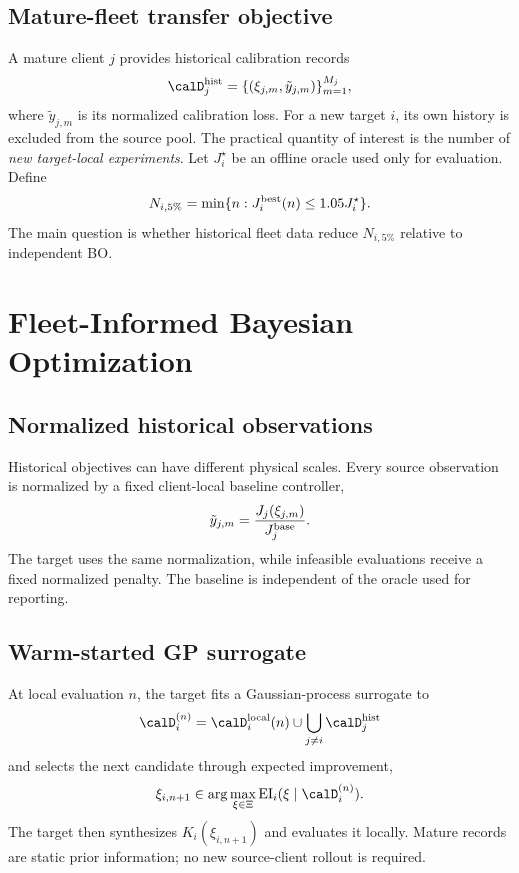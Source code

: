 \subsection{Mature-fleet transfer objective}
A mature client $j$ provides historical calibration records
\begin{equation}
 \calD_j^{\rm hist}=\{(\xi_{j,m},\tilde y_{j,m})\}_{m=1}^{M_j},
\end{equation}
where $\tilde y_{j,m}$ is its normalized calibration loss. For a new target $i$, its own history is excluded from the source pool. The practical quantity of interest is the number of \emph{new target-local experiments}. Let $J_i^\star$ be an offline oracle used only for evaluation. Define
\begin{equation}
 N_{i,5\%}=\min\{n:J_i^{\rm best}(n)\le1.05J_i^\star\}.
 \label{eq:n5}
\end{equation}
The main question is whether historical fleet data reduce $N_{i,5\%}$ relative to independent BO.

\section{Fleet-Informed Bayesian Optimization}
\subsection{Normalized historical observations}
Historical objectives can have different physical scales. Every source observation is normalized by a fixed client-local baseline controller,
\begin{equation}
 \tilde y_{j,m}=\frac{J_j(\xi_{j,m})}{J_j^{\rm base}}.
 \label{eq:normalization}
\end{equation}
The target uses the same normalization, while infeasible evaluations receive a fixed normalized penalty. The baseline is independent of the oracle used for reporting.

\subsection{Warm-started GP surrogate}
At local evaluation $n$, the target fits a Gaussian-process surrogate to
\begin{equation}
 \calD_i^{(n)}=\calD_i^{\rm local}(n)\cup\bigcup_{j\ne i}\calD_j^{\rm hist}
\end{equation}
and selects the next candidate through expected improvement,
\begin{equation}
 \xi_{i,n+1}\in\arg\max_{\xi\in\Xi}\operatorname{EI}_i(\xi\mid\calD_i^{(n)}).
 \label{eq:ei}
\end{equation}
The target then synthesizes $K_i(\xi_{i,n+1})$ and evaluates it locally. Mature records are static prior information; no new source-client rollout is required.

